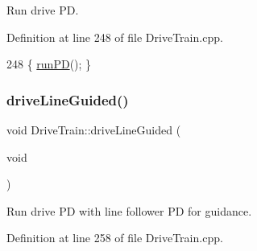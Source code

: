 Run drive PD. 



Definition at line 248 of file Drive\+Train.\+cpp.


\begin{DoxyCode}
248 \{ \hyperlink{class_drive_train_a8355f8e214ceb1ecf1bce299ba692b22}{runPD}(); \}
\end{DoxyCode}
\mbox{\label{class_drive_train_ace3dfd00c11b3d001179370c2aa79be4}} 
\subsubsection{\texorpdfstring{drive\+Line\+Guided()}{driveLineGuided()}}
{\footnotesize\ttfamily void Drive\+Train\+::drive\+Line\+Guided (\begin{DoxyParamCaption}\item[{void}]{ }\end{DoxyParamCaption})}



Run drive PD with line follower PD for guidance. 



Definition at line 258 of file Drive\+Train.\+cpp.


